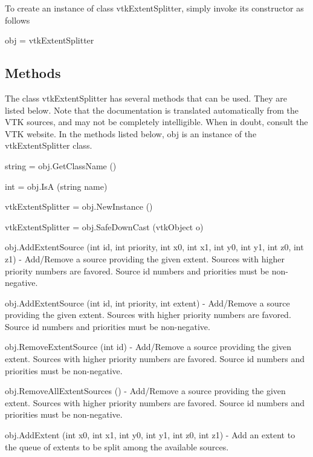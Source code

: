 To create an instance of class vtk\-Extent\-Splitter, simply invoke its constructor as follows \begin{DoxyVerb}  obj = vtkExtentSplitter
\end{DoxyVerb}
 \hypertarget{vtkwidgets_vtkxyplotwidget_Methods}{}\subsection{Methods}\label{vtkwidgets_vtkxyplotwidget_Methods}
The class vtk\-Extent\-Splitter has several methods that can be used. They are listed below. Note that the documentation is translated automatically from the V\-T\-K sources, and may not be completely intelligible. When in doubt, consult the V\-T\-K website. In the methods listed below, {\ttfamily obj} is an instance of the vtk\-Extent\-Splitter class. 
\begin{DoxyItemize}
\item {\ttfamily string = obj.\-Get\-Class\-Name ()}  
\item {\ttfamily int = obj.\-Is\-A (string name)}  
\item {\ttfamily vtk\-Extent\-Splitter = obj.\-New\-Instance ()}  
\item {\ttfamily vtk\-Extent\-Splitter = obj.\-Safe\-Down\-Cast (vtk\-Object o)}  
\item {\ttfamily obj.\-Add\-Extent\-Source (int id, int priority, int x0, int x1, int y0, int y1, int z0, int z1)} -\/ Add/\-Remove a source providing the given extent. Sources with higher priority numbers are favored. Source id numbers and priorities must be non-\/negative.  
\item {\ttfamily obj.\-Add\-Extent\-Source (int id, int priority, int extent)} -\/ Add/\-Remove a source providing the given extent. Sources with higher priority numbers are favored. Source id numbers and priorities must be non-\/negative.  
\item {\ttfamily obj.\-Remove\-Extent\-Source (int id)} -\/ Add/\-Remove a source providing the given extent. Sources with higher priority numbers are favored. Source id numbers and priorities must be non-\/negative.  
\item {\ttfamily obj.\-Remove\-All\-Extent\-Sources ()} -\/ Add/\-Remove a source providing the given extent. Sources with higher priority numbers are favored. Source id numbers and priorities must be non-\/negative.  
\item {\ttfamily obj.\-Add\-Extent (int x0, int x1, int y0, int y1, int z0, int z1)} -\/ Add an extent to the queue of extents to be split among the available sources.  

\end{DoxyItemize}
